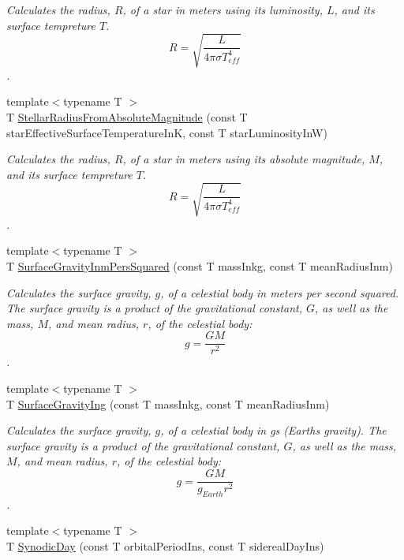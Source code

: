 \begin{DoxyCompactItemize}
\begin{DoxyCompactList}\small\item\em Calculates the radius, $R$, of a star in meters using its luminosity, $L$, and its surface tempreture $T$. \[R=\sqrt{\dfrac{L}{4\pi \sigma T_{eff}^4}}\]. \end{DoxyCompactList}\item 
{\footnotesize template$<$typename T $>$ }\\T \mbox{\hyperlink{group___e_g_x_phys-_stellar_radius_ga5c476c4ebcb0ad3e93a21393788d3dc2}{Stellar\+Radius\+From\+Absolute\+Magnitude}} (const T star\+Effective\+Surface\+Temperature\+InK, const T star\+Luminosity\+InW)
\begin{DoxyCompactList}\small\item\em Calculates the radius, $R$, of a star in meters using its absolute magnitude, $M$, and its surface tempreture $T$. \[R=\sqrt{\dfrac{L}{4\pi \sigma T_{eff}^4}}\]. \end{DoxyCompactList}\item 
{\footnotesize template$<$typename T $>$ }\\T \mbox{\hyperlink{group___e_g_x_phys-_astrophysics-_surface_gravity_gaf7e1f42b674fe8bb2211c40882a7d5b6}{Surface\+Gravity\+Inm\+Pers\+Squared}} (const T mass\+Inkg, const T mean\+Radius\+Inm)
\begin{DoxyCompactList}\small\item\em Calculates the surface gravity, $g$, of a celestial body in meters per second squared. The surface gravity is a product of the gravitational constant, $G$, as well as the mass, $M$, and mean radius, $r$, of the celestial body\+: \[g = \frac{GM}{r^2}\]. \end{DoxyCompactList}\item 
{\footnotesize template$<$typename T $>$ }\\T \mbox{\hyperlink{group___e_g_x_phys-_astrophysics-_surface_gravity_gab5bb479758d72608ef6ada063f6c1a1b}{Surface\+Gravity\+Ing}} (const T mass\+Inkg, const T mean\+Radius\+Inm)
\begin{DoxyCompactList}\small\item\em Calculates the surface gravity, $g$, of a celestial body in gs (Earth\textquotesingle{}s gravity). The surface gravity is a product of the gravitational constant, $G$, as well as the mass, $M$, and mean radius, $r$, of the celestial body\+: \[g = \frac{GM}{g_{Earth}r^2}\]. \end{DoxyCompactList}\item 
{\footnotesize template$<$typename T $>$ }\\T \mbox{\hyperlink{group___e_g_x_phys-_astrophysic-_synodic_day_ga637140842bc008c87d90e65b551cbac7}{Synodic\+Day}} (const T orbital\+Period\+Ins, const T sidereal\+Day\+Ins)

\end{DoxyCompactItemize}
